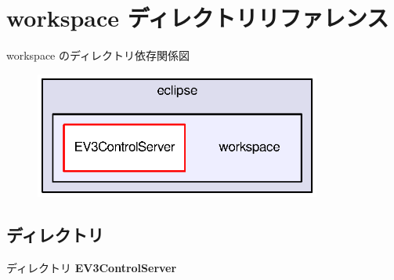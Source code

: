 \section{workspace ディレクトリリファレンス}
\label{dir_bb2be7f70403c819abfff8b86e9072f9}
workspace のディレクトリ依存関係図\nopagebreak
\begin{figure}[H]
\begin{center}
\leavevmode
\includegraphics[width=267pt]{dir_bb2be7f70403c819abfff8b86e9072f9_dep}
\end{center}
\end{figure}
\subsection*{ディレクトリ}
\begin{DoxyCompactItemize}
\item 
ディレクトリ {\bf E\-V3\-Control\-Server}
\end{DoxyCompactItemize}
